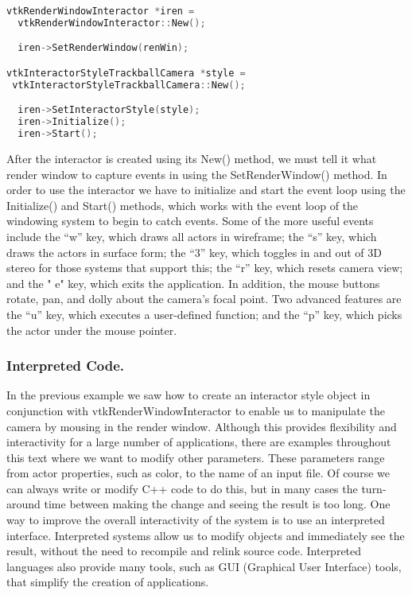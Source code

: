 \begin{lstlisting}[language=C++, caption={Cone5.cxx}]
vtkRenderWindowInteractor *iren =
  vtkRenderWindowInteractor::New();

  iren->SetRenderWindow(renWin);

vtkInteractorStyleTrackballCamera *style =
 vtkInteractorStyleTrackballCamera::New();

  iren->SetInteractorStyle(style);
  iren->Initialize();
  iren->Start();
\end{lstlisting}

After the interactor is created using its New() method, we must tell it what render window to capture events in using the SetRenderWindow() method. In order to use the interactor we have to initialize and start the event loop using the Initialize() and Start() methods, which works with the event loop of the windowing system to begin to catch events. Some of the more useful events include the ``w'' key, which draws all actors in wireframe; the ``s'' key, which draws the actors in surface form; the ``3'' key, which toggles in and out of 3D stereo for those systems that support this; the ``r'' key, which resets camera view; and the " e" key, which exits the application. In addition, the mouse buttons rotate, pan, and dolly about the camera's focal point. Two advanced features are the ``u'' key, which executes a user-defined function; and the ``p'' key, which picks the actor under the mouse pointer.

\subsubsection{Interpreted Code.}
\label{pg:ic}
In the previous example we saw how to create an interactor style object in conjunction with vtkRenderWindowInteractor to enable us to manipulate the camera by mousing in the render window. Although this provides flexibility and interactivity for a large number of applications, there are examples throughout this text where we want to modify other parameters. These parameters range from actor properties, such as color, to the name of an input file. Of course we can always write or modify C++ code to do this, but in many cases the turn-around time between making the change and seeing the result is too long. One way to improve the overall interactivity of the system is to use an interpreted interface. Interpreted systems allow us to modify objects and immediately see the result, without the need to recompile and relink source code. Interpreted languages also provide many tools, such as GUI (Graphical User Interface) tools, that simplify the creation of applications.

